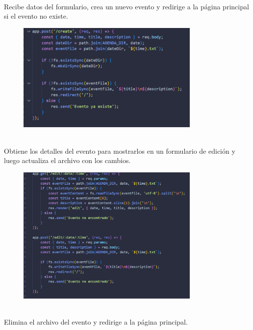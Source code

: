 \documentclass{article}
\begin{document}
\\
Recibe datos del formulario, crea un nuevo evento y redirige a la página principal si el evento no existe.

    \begin{figure}[H]
		          \centering
		          \includegraphics[width=0.8\textwidth,keepaspectratio]                       {img/crearEv.png}
    \end{figure}    
\\
Obtiene los detalles del evento para mostrarlos en un formulario de edición y luego actualiza el archivo con los cambios.
     \begin{figure}[H]
		          \centering
		          \includegraphics[width=0.8\textwidth,keepaspectratio]                       {img/editarEv.png}
    \end{figure}    

\\Elimina el archivo del evento y redirige a la página principal.
\end{document}
